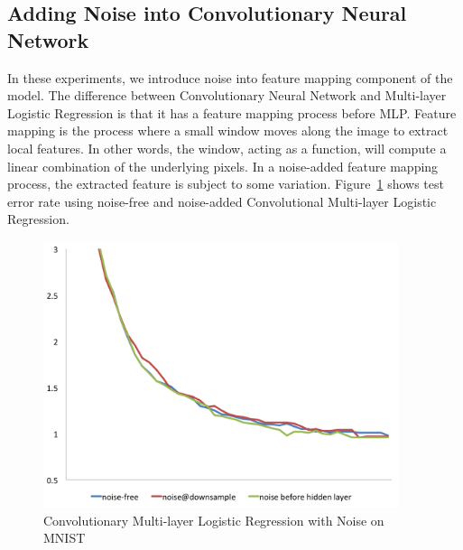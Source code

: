 \subsection{Adding Noise into Convolutionary Neural Network}
In these experiments, we introduce noise into feature mapping component of
the model. The difference between Convolutionary Neural Network and
Multi-layer Logistic Regression is that it has a feature mapping process
before MLP. Feature mapping is the process where a small window moves along
the image to extract local features. In other words, the window, acting as
a function, will compute a linear combination of the underlying pixels.
In a noise-added feature mapping process, the extracted feature is subject
to some variation.
Figure~\ref{convo} shows test error rate using noise-free and noise-added
Convolutional Multi-layer Logistic Regression.
\begin{figure}[!htbp]
\centering
\label{convo}
\caption{Convolutionary Multi-layer Logistic Regression with Noise on
MNIST}
\includegraphics[width=295pt]{f-figs/convo.png}
\end{figure}

